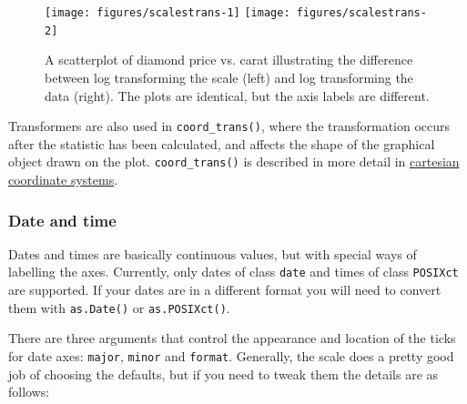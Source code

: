 \begin{Shaded}
\begin{Highlighting}[]
\NormalTok{(} 
 \StringTok{ }
\StringTok{  }\NormalTok{() +}\StringTok{ }\NormalTok{()}
\end{Highlighting}
\end{Shaded}

\begin{figure}

{\centering \texttt{[image: figures/scalestrans-1]} \texttt{[image: figures/scalestrans-2]} 

}

\caption{A scatterplot of diamond price vs. carat illustrating the difference between log transforming the scale (left) and log transforming the data (right).  The plots are identical, but the axis labels are different.\label{fig:trans}}
\end{figure}

Transformers are also used in \texttt{coord\_trans()}, where the
transformation occurs after the statistic has been calculated, and
affects the shape of the graphical object drawn on the plot.
\texttt{coord\_trans()} is described in more detail in
\hyperref[sub:cartesian]{cartesian coordinate systems}.

\subsubsection{Date and time}\label{ssub:scale-date}

Dates and times are basically continuous values, but with special ways
of labelling the axes. Currently, only dates of class \texttt{date} and
times of class \texttt{POSIXct} are supported. If your dates are in a
different format you will need to convert them with \texttt{as.Date()}
or \texttt{as.POSIXct()}.  
 

There are three arguments that control the appearance and location of
the ticks for date axes: \texttt{major}, \texttt{minor} and
\texttt{format}. Generally, the scale does a pretty good job of choosing
the defaults, but if you need to tweak them the details are as follows:

